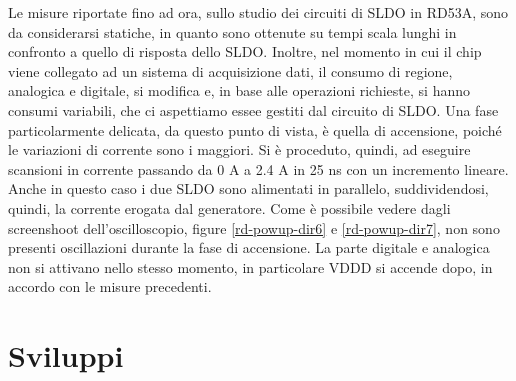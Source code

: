 Le misure riportate fino ad ora, sullo studio dei circuiti di SLDO in RD53A, sono da considerarsi statiche, in quanto sono ottenute su tempi scala lunghi in confronto a quello di risposta dello SLDO. 
Inoltre, nel momento in cui il chip viene collegato ad un sistema di acquisizione dati, il consumo di regione, analogica e digitale, si modifica e, in base alle operazioni richieste, si hanno consumi variabili, che ci aspettiamo essee gestiti dal circuito di SLDO. 
Una fase particolarmente delicata, da questo punto di vista, è quella di accensione, poiché le variazioni di corrente sono i maggiori. 
Si è proceduto, quindi, ad eseguire scansioni in corrente passando da 0 A a 2.4 A in 25 ns con un incremento lineare. 
Anche in questo caso i due SLDO sono alimentati in parallelo, suddividendosi, quindi, la corrente erogata dal generatore. 
Come è possibile vedere dagli screenshoot dell'oscilloscopio, figure \ref{rd-powup-dir6} e \ref{rd-powup-dir7}, non sono presenti oscillazioni durante la fase di accensione.
La parte digitale e analogica non si attivano nello stesso momento, in particolare VDDD si accende dopo, in accordo con le misure precedenti.

\section{Sviluppi}

